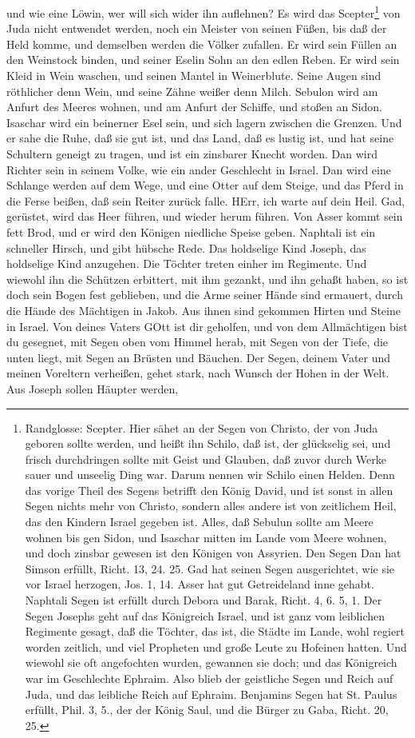 \begin{schriftzitat}
und wie eine Löwin, wer will sich wider ihn auflehnen? Es wird das Scepter\footnote{Randglosse: Scepter. Hier sähet an der Segen von Christo, der von Juda geboren sollte werden, und heißt ihn Schilo, daß ist, der glückselig sei, und frisch durchdringen sollte mit Geist und Glauben, daß zuvor durch Werke sauer und unseelig Ding war. Darum nennen wir Schilo einen Helden. Denn das vorige Theil des Segens betrifft den König David, und ist sonst in allen Segen nichts mehr von Christo, sondern alles andere ist von zeitlichem Heil, das den Kindern Israel gegeben ist. Alles, daß Sebulun sollte am Meere wohnen bis gen Sidon, und Isaschar mitten im Lande vom Meere wohnen, und doch zinsbar gewesen ist den Königen von Assyrien. Den Segen Dan hat Simson erfüllt, Richt. 13, 24. 25. Gad hat seinen Segen ausgerichtet, wie sie vor Israel herzogen, Jos. 1, 14. Asser hat gut Getreideland inne gehabt. Naphtali Segen ist erfüllt durch Debora und Barak, Richt. 4, 6. 5, 1. Der Segen Josephs geht auf das Königreich Israel, und ist ganz vom leiblichen Regimente gesagt, daß die Töchter, das ist, die Städte im Lande, wohl regiert worden zeitlich, und viel Propheten und große Leute zu Hofeinen hatten. Und wiewohl sie oft angefochten wurden, gewannen sie doch; und das Königreich war im Geschlechte Ephraim. Also blieb der geistliche Segen und Reich auf Juda, und das leibliche Reich auf Ephraim. Benjamins Segen hat St. Paulus erfüllt, Phil. 3, 5., der der König Saul, und die Bürger zu Gaba, Richt. 20, 25.} von Juda nicht entwendet werden, noch ein Meister von seinen Füßen, bis daß der Held komme, und demselben werden die Völker zufallen. Er wird sein Füllen an den Weinstock binden, und seiner Eselin Sohn an den edlen Reben. Er wird sein Kleid in Wein waschen, und seinen Mantel in Weinerblute. Seine Augen sind röthlicher denn Wein, und seine Zähne weißer denn Milch. Sebulon wird am Anfurt des Meeres wohnen, und am Anfurt der Schiffe, und stoßen an Sidon. Isaschar wird ein beinerner Esel sein, und sich lagern zwischen die Grenzen. Und er sahe die Ruhe, daß sie gut ist, und das Land, daß es lustig ist, und hat seine Schultern geneigt zu tragen, und ist ein zinsbarer Knecht worden. Dan wird Richter sein in seinem Volke, wie ein ander Geschlecht in Israel. Dan wird eine Schlange werden auf dem Wege, und eine Otter auf dem Steige, und das Pferd in die Ferse beißen, daß sein Reiter zurück falle. HErr, ich warte auf dein Heil. Gad, gerüstet, wird das Heer führen, und wieder herum führen. Von Asser kommt sein fett Brod, und er wird den Königen niedliche Speise geben. Naphtali ist ein schneller Hirsch, und gibt hübsche Rede. Das holdselige Kind Joseph, das holdselige Kind anzugehen. Die Töchter treten einher im Regimente. Und wiewohl ihn die Schützen erbittert, mit ihm gezankt, und ihn gehaßt haben, so ist doch sein Bogen fest geblieben, und die Arme seiner Hände sind ermauert, durch die Hände des Mächtigen in Jakob. Aus ihnen sind gekommen Hirten und Steine in Israel. Von deines Vaters GOtt ist dir geholfen, und von dem Allmächtigen bist du gesegnet, mit Segen oben vom Himmel herab, mit Segen von der Tiefe, die unten liegt, mit Segen an Brüsten und Bäuchen. Der Segen, deinem Vater und meinen Voreltern verheißen, gehet stark, nach Wunsch der Hohen in der Welt. Aus Joseph sollen Häupter werden, 
\end{schriftzitat}
